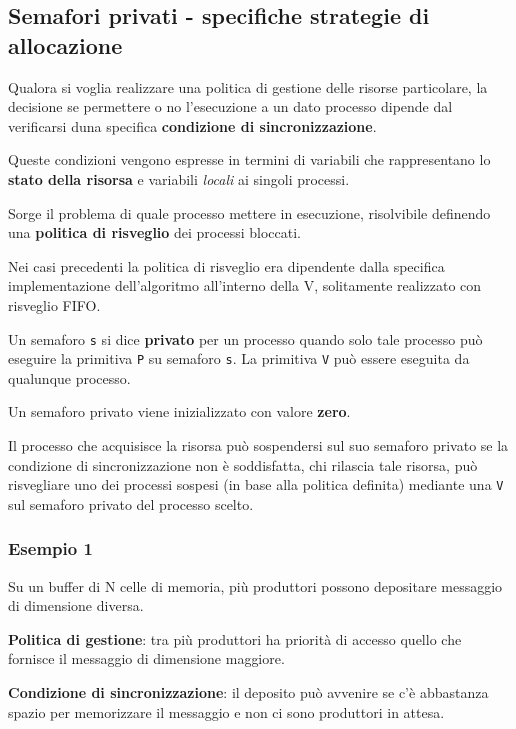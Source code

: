 \subsection{Semafori privati - specifiche strategie di allocazione}
Qualora si voglia realizzare una politica di gestione delle risorse particolare, la decisione se permettere o no l'esecuzione a un dato processo dipende dal verificarsi duna specifica \textbf{condizione di sincronizzazione}.

Queste condizioni vengono espresse in termini di variabili che rappresentano lo \textbf{stato della risorsa} e variabili \textit{locali} ai singoli processi.

Sorge il problema di quale processo mettere in esecuzione, risolvibile definendo una \textbf{politica di risveglio} dei processi bloccati.

Nei casi precedenti la politica di risveglio era dipendente dalla specifica implementazione dell'algoritmo all'interno della V, solitamente realizzato con risveglio FIFO.

\begin{mdframed}[topline=false,bottomline=false,rightline=false]
    Un semaforo \texttt{s} si dice \textbf{privato} per un processo quando solo tale processo può eseguire la primitiva \texttt{P} su semaforo \texttt{s}. La primitiva \texttt{V} può essere eseguita da qualunque processo.
\end{mdframed}

Un semaforo privato viene inizializzato con valore \textbf{zero}.

Il processo che acquisisce la risorsa può sospendersi sul suo semaforo privato se la condizione di sincronizzazione non è soddisfatta, chi rilascia tale risorsa, può risvegliare uno dei processi sospesi (in base alla politica definita) mediante una \texttt{V} sul semaforo privato del processo scelto.

\subsubsection{Esempio 1}
Su un buffer di N celle di memoria, più produttori possono depositare messaggio di dimensione diversa.

\textbf{Politica di gestione}: tra più produttori ha priorità di accesso quello che fornisce il messaggio di dimensione maggiore.

\textbf{Condizione di sincronizzazione}: il deposito può avvenire se c'è abbastanza spazio per memorizzare il messaggio e non ci sono produttori in attesa.

